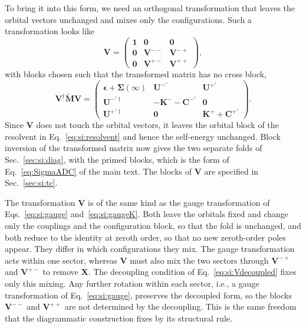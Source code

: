 \documentclass[aip,jcp,reprint,noshowkeys,superscriptaddress]{revtex4-2}
\theoremstyle{plain}
\theoremstyle{definition}
\theoremstyle{remark}
\begin{document}
To bring it into this form, we need an orthogonal transformation that leaves the orbital vectors unchanged and mixes only the configurations. Such a transformation looks like
\begin{equation}
\mathbf{V}=
\begin{pmatrix}
\mathbf{1} & \mathbf{0} & \mathbf{0}\\
\mathbf{0} & \mathbf{V}^{--} & \mathbf{V}^{-+}\\
\mathbf{0} & \mathbf{V}^{+-} & \mathbf{V}^{++}
\end{pmatrix} ,
\label{eq:si:Vform}
\end{equation}
with blocks chosen such that the transformed matrix has no cross block,
\begin{equation}
\mathbf{V}^\dagger\tilde{\mathbf{M}}\mathbf{V}=
\begin{pmatrix}
\pmb{\epsilon}+\pmb{\Sigma}(\infty) & \mathbf{U}^{-\prime} & \mathbf{U}^{+\prime}\\
\mathbf{U}^{-\prime\dagger} & -\mathbf{K}^{-}-\mathbf{C}^{-\prime} & \mathbf{0}\\
\mathbf{U}^{+\prime\dagger} & \mathbf{0} & \mathbf{K}^{+}+\mathbf{C}^{+\prime}
\end{pmatrix} .
\label{eq:si:Vdecoupled}
\end{equation}
Since $\mathbf{V}$ does not touch the orbital vectors, it leaves the orbital block of the resolvent in Eq.~\eqref{eq:si:resolvent} and hence the self-energy
unchanged. Block inversion of the transformed matrix now gives the two separate folds of Sec.~\ref{sec:si:diag}, with the primed blocks, which is the form of Eq.~\eqref{eq:SigmaADC} of the main text. The blocks of $\mathbf{V}$ are specified in Sec.~\ref{sec:si:tc}.

The transformation $\mathbf{V}$ is of the same kind as the gauge transformation of Eqs.~\eqref{eq:si:gauge} and~\eqref{eq:si:gaugeK}. Both leave the orbitals fixed and change only the couplings and the configuration block, so that the fold is unchanged, and both reduce to the identity at zeroth order, so that no new zeroth-order poles appear. They differ in which configurations they mix. The gauge transformation acts within one sector, whereas $\mathbf{V}$ must also mix the two sectors through $\mathbf{V}^{-+}$ and $\mathbf{V}^{+-}$ to remove $\mathbf{X}$. The decoupling condition of Eq.~\eqref{eq:si:Vdecoupled} fixes only this mixing. Any further rotation within each sector, i.e., a gauge transformation of Eq.~\eqref{eq:si:gauge},
preserves the decoupled form, so the blocks $\mathbf{V}^{--}$ and $\mathbf{V}^{++}$ are not determined by the decoupling. This is the same freedom that the diagrammatic construction fixes by its structural rule.
\end{document}
